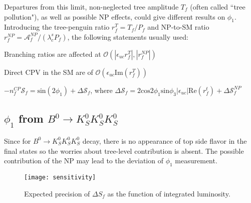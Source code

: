Departures from this limit, non-neglected tree amplitude $T_f$ (often called ``tree pollution"), as well as possible NP effects, could give different results on $\phi_1$. Introducing the tree-penguin ratio $r^T_f = T_f / P_f$ and NP-to-SM ratio $r^{NP}_f = \mathcal{A}^{NP}_f / (\lambda^s_c P_f)$, the following statements usually used\cite{b2book}:

\textbullet \space Branching ratios are affected at $\mathcal{O}(|\epsilon_{uc}r^T_f|,|r^{NP}_f|)$

\textbullet \space Direct CPV in the SM are of $\mathcal{O}(\epsilon_{uc}\text{Im}(r^T_f))$


\textbullet \space $-n^{CP}_f\mathcal{S}_f = \text{sin}(2\phi_1) + \Delta \mathcal{S}_f$, where
$\Delta \mathcal{S}_f=2\text{cos}2\phi_1 \text{sin}\phi_3 |\epsilon_{uc}| \text{Re}(r^t_f) + \Delta \mathcal{S}^{NP}_f$


\subsection{$\phi_1$ from $B^0 \to K_S^0  K_S^0  K_S^0$}%
Since for $B^0 \to K_S^0  K_S^0  K_S^0$ decay, there is no appearance of top side flavor in the final states so the worries about tree-level contribution is absent. The possible contribution of the NP may lead to the deviation of $\phi_1$ measurement.




\begin{figure}[H]
	\centering
	\texttt{[image: sensitivity]}
	\caption{Expected precision of $\Delta S_f$ as the function of integrated luminosity.}
\end{figure}


